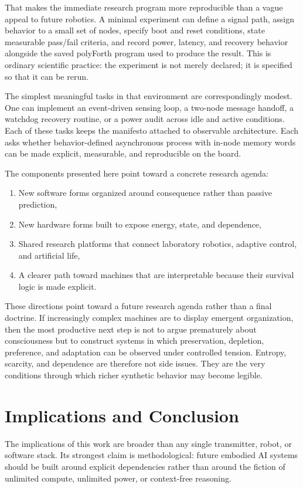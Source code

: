 \documentclass[a4paper,english]{article}
\begin{document}
That makes the immediate research program more reproducible than a
vague appeal to future robotics. A minimal experiment can define a
signal path, assign behavior to a small set of nodes, specify boot
and reset conditions, state measurable pass/fail criteria, and record
power, latency, and recovery behavior alongside the saved polyForth
program used to produce the result. This is ordinary scientific practice:
the experiment is not merely declared; it is specified so that it
can be rerun.

The simplest meaningful tasks in that environment are correspondingly
modest. One can implement an event-driven sensing loop, a two-node
message handoff, a watchdog recovery routine, or a power audit across
idle and active conditions. Each of these tasks keeps the manifesto
attached to observable architecture. Each asks whether behavior-defined
asynchronous process with in-node memory words can be made explicit,
measurable, and reproducible on the board.

The components presented here point toward a concrete research agenda:
\begin{enumerate}
\item New software forms organized around consequence rather than passive
prediction,
\item New hardware forms built to expose energy, state, and dependence,
\item Shared research platforms that connect laboratory robotics, adaptive
control, and artificial life,
\item A clearer path toward machines that are interpretable because their
survival logic is made explicit.
\end{enumerate}
These directions point toward a future research agenda rather than
a final doctrine. If increasingly complex machines are to display
emergent organization, then the most productive next step is not to
argue prematurely about consciousness but to construct systems in
which preservation, depletion, preference, and adaptation can be observed
under controlled tension. Entropy, scarcity, and dependence are therefore
not side issues. They are the very conditions through which richer
synthetic behavior may become legible.

\section{Implications and Conclusion}

The implications of this work are broader than any single transmitter,
robot, or software stack. Its strongest claim is methodological: future
embodied AI systems should be built around explicit dependencies rather
than around the fiction of unlimited compute, unlimited power, or
context-free reasoning.
\end{document}

